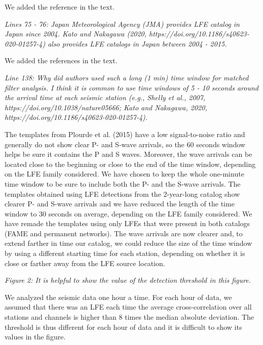 \documentclass[letterpaper, 12pt]{article}
\begin{document}
\bigskip

We added the reference in the text.

\bigskip

\textit{Lines 75 - 76: Japan Meteorological Agency (JMA) provides LFE catalog in Japan since 2004. Kato and Nakagawa (2020, https://doi.org/10.1186/s40623-020-01257-4) also provides LFE catalogs in Japan between 2004 - 2015.}

\bigskip

We added the references in the text.

\bigskip

\textit{Line 138: Why did authors used such a long (1 min) time window for matched filter analysis. I think it is common to use time windows of 5 - 10 seconds around the arrival time at each seismic station (e.g., Shelly et al., 2007, https://doi.org/10.1038/nature05666; Kato and Nakagawa, 2020, https://doi.org/10.1186/s40623-020-01257-4).}

\bigskip

The templates from Plourde et al. (2015) have a low signal-to-noise ratio and generally do not show clear P- and S-wave arrivals, so the 60 seconds window helps be sure it contains the P and S waves. Moreover, the wave arrivals can be located close to the beginning or close to the end of the time window, depending on the LFE family considered. We have chosen to keep the whole one-minute time window to be sure to include both the P- and the S-wave arrivals. The templates obtained using LFE detections from the 2-year-long catalog show clearer P- and S-wave arrivals and we have reduced the length of the time window to 30 seconds on average, depending on the LFE family considered. We have remade the templates using only LFEs that were present in both catalogs (FAME and permanent networks). The wave arrivals are now clearer and, to extend farther in time our catalog, we could reduce the size of the time window by using a different starting time for each station, depending on whether it is close or farther away from the LFE source location. 

\bigskip

\textit{Figure 2: It is helpful to show the value of the detection threshold in this figure.}

\bigskip

We analyzed the seismic data one hour a time. For each hour of data, we assumed that there was an LFE each time the average cross-correlation over all stations and channels is higher than 8 times the median absolute deviation. The threshold is thus different for each hour of data and it is difficult to show its values in the figure.
\end{document}
